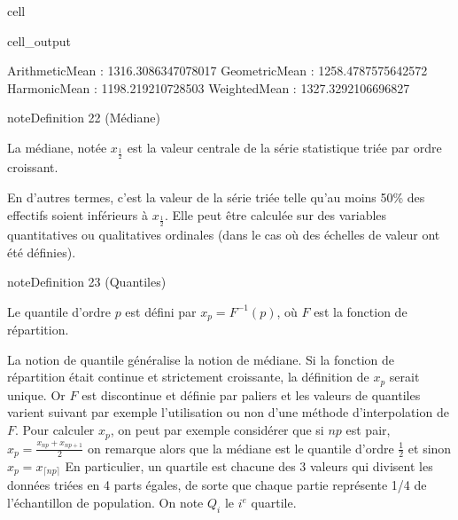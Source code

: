 \documentclass[letterpaper,10pt,english]{jupyterBook}
\begin{document}
\begin{sphinxuseclass}{cell}
\begin{sphinxVerbatimOutput}
\begin{sphinxuseclass}{cell_output}
\begin{sphinxVerbatim}[commandchars=\\\{\}]
ArithmeticMean  :  1316.3086347078017
GeometricMean  :  1258.4787575642572
HarmonicMean  :  1198.219210728503
WeightedMean  :  1327.3292106696827
\end{sphinxVerbatim}

\noindent{}

\end{sphinxuseclass}\end{sphinxVerbatimOutput}

\end{sphinxuseclass}\label{statsdescriptives:definition-6}
\begin{sphinxadmonition}{note}{Definition 22 (Médiane)}



\sphinxAtStartPar
La médiane, notée \(x_\frac{1}{2}\) est la valeur centrale de la série statistique triée par ordre croissant.
\end{sphinxadmonition}

\sphinxAtStartPar
En d’autres termes, c’est la valeur de la série triée telle qu’au moins 50\% des effectifs soient inférieurs à \(x_\frac{1}{2}\). Elle peut être calculée sur des variables quantitatives ou qualitatives ordinales (dans le cas où des échelles de valeur ont été définies).
\label{statsdescriptives:definition-7}
\begin{sphinxadmonition}{note}{Definition 23 (Quantiles)}



\sphinxAtStartPar
Le quantile d’ordre \(p\) est défini par \(x_p=F^{-1}(p)\), où \(F\) est la fonction de répartition.
\end{sphinxadmonition}

\sphinxAtStartPar
La notion de quantile généralise la notion de médiane. Si la fonction de répartition était continue et strictement croissante, la définition de \(x_p\) serait unique. Or \(F\) est discontinue et définie par paliers et les valeurs de quantiles varient suivant par exemple l’utilisation ou non d’une méthode d’interpolation de \(F\). Pour calculer \(x_p\), on peut par exemple considérer que si \(np\) est pair,
\(x_p=\frac{x_{np}+x_{np+1}}{2}\)
on remarque alors que la médiane est le quantile d’ordre \(\frac{1}{2}\)
et sinon
\(x_p=x_{\lceil{np}\rceil}\)
En particulier, un quartile est chacune des 3 valeurs qui divisent les données triées en 4 parts égales, de sorte que chaque partie représente 1/4 de l’échantillon de population. On note \(Q_i\) le \(i^e\) quartile.
\end{document}
